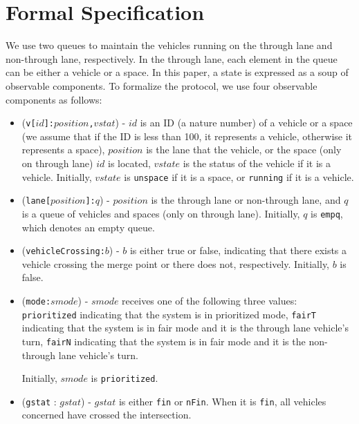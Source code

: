 \documentclass[10pt, conference, compsocconf]{IEEEtran}
\begin{document}
\section{Formal Specification}
 \label{sect_formal}
We use two queues to maintain the vehicles running on the through lane and non-through lane, respectively.
In the through lane, each element in the queue can be either a vehicle or a space.
In this paper, a state is expressed as a soup of observable components.
To formalize the protocol, we use four observable components as follows:
\begin{itemize}
  \item (\verb!v[!$id$\verb!]:!$position$\verb!,!$vstat$) - $id$ is an ID (a nature number) of 
  a vehicle or a space (we assume that if the ID is less than 100, it represents a vehicle, otherwise it 
  represents a space), 
  $position$ is the lane that the vehicle, or the space (only on through lane) $id$ is located, 
  $vstate$ is the status of the vehicle if it is a 
  vehicle. Initially, $vstate$ is \verb!unspace! if it is a space, or \verb!running! if it is a vehicle.
  \item (\verb!lane[!$position$\verb!]:!$q$) - $position$ is the through lane or 
  non-through lane, and $q$ is a queue of vehicles and spaces (only on through lane). 
  Initially, $q$ is \verb!empq!, which denotes an empty queue.
    
  \item (\verb!vehicleCrossing:!$b$) - $b$ is either true or false, indicating that there 
  exists a vehicle crossing the merge point or there does not, respectively. Initially, $b$ is false.
  
  \item (\verb!mode:!$smode$) - $smode$ receives one of the following three values: 
  \verb!prioritized! indicating that the system is in prioritized mode, 
  \verb!fairT! indicating that the system is in fair mode and it is the through lane vehicle's turn,
  \verb!fairN! indicating that the system is in fair mode and it is the non-through lane vehicle's turn.
  
  Initially, $smode$ is \verb!prioritized!.
  
  \item (\verb!gstat! : $gstat$) -  $gstat$ is either \verb!fin! or \verb!nFin!.
  When it is \verb!fin!, all vehicles concerned have crossed the intersection.
\end{itemize}
\end{document}
